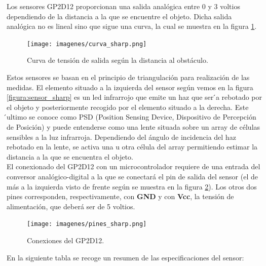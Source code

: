 Los sensores GP2D12 proporcionan una salida analógica entre 0 y 3 voltios dependiendo de la distancia a la que se encuentre el objeto. Dicha salida analógica no es
lineal sino que sigue una curva, la cual se muestra en la figura \ref{figura:curva_sharp}.

 \begin{figure}[H]
  \begin{center}
    \texttt{[image: imagenes/curva\_sharp.png]}
  \end{center}
  \caption{Curva de tensión de salida según la distancia al obstáculo.}
  \label{figura:curva_sharp}
\end{figure}

Estos sensores se basan en el principio de triangulación para realización de las medidas. El elemento situado a la izquierda del sensor según vemos en la figura \ref{figura:sensor_sharp}
es un led infrarrojo que emite un haz que ser ́a rebotado por el objeto y posteriormente recogido por el elemento situado a la derecha. Este ́ultimo se conoce como PSD (Position 
Sensing Device, Dispositivo de Percepción de Posición)  y  puede  entenderse  como  una  lente situada sobre un array de células sensibles a la luz infrarroja. Dependiendo del 
ángulo de incidencia del haz rebotado en la lente, se activa una u otra célula del array permitiendo estimar la distancia a la que se encuentra el objeto.\\

El conexionado del GP2D12 con un microcontrolador requiere de una entrada del conversor analógico-digital a la que se conectará el pin de salida del sensor 
(el de más a la izquierda visto de frente según se muestra en la figura \ref{figura:pines_sharp}). Los otros dos pines corresponden, respectivamente, con \textbf{GND} y con
\textbf{Vcc}, la tensión de alimentación, que deberá ser de 5 voltios.\\

 \begin{figure}[H]
  \begin{center}
    \texttt{[image: imagenes/pines\_sharp.png]}
  \end{center}
  \caption{Conexiones del GP2D12.}
  \label{figura:pines_sharp}
\end{figure}

En la siguiente tabla se recoge un resumen de las especificaciones del sensor:\\


